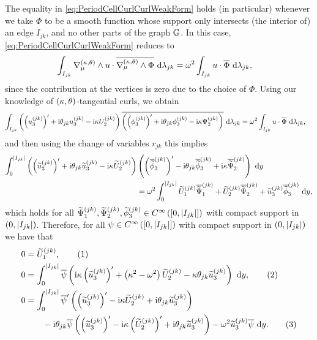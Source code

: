 \documentclass[11pt]{report}
\newcommand\labelthis{\addtocounter{equation}{1}\tag{\theequation}}
\begin{document}
The equality in \eqref{eq:PeriodCellCurlCurlWeakForm} holds (in particular) whenever we take $\Phi$ to be a smooth function whose support only intersects (the interior of) an edge $I_{jk}$, and no other parts of the graph $\mathbb{G}$.
In this case, \eqref{eq:PeriodCellCurlCurlWeakForm} reduces to
\begin{align*}
	\int_{I_{jk}} \nabla_{\mu}^{\left( \kappa, \theta \right)}\wedge u\cdot\overline{\nabla_{\mu}^{\left( \kappa, \theta \right)}\wedge\Phi}  \ \mathrm{d}\lambda_{jk} &= \omega^2 \int_{I_{jk}} u\cdot\overline{\Phi}  \ \mathrm{d}\lambda_{jk},
\end{align*}
since the contribution at the vertices is zero due to the choice of $\Phi$.
Using our knowledge of $\left( \kappa, \theta \right)$-tangential curls, we obtain
\begin{align*}
	\int_{I_{jk}} \left(  \left( u_3^{(jk)} \right)' + \mathrm{i}\theta_{jk} u_3^{(jk)} - \mathrm{i}\kappa U_2^{(jk)}  \right)\overline{\left(  \left( \phi_3^{(jk)} \right)' + \mathrm{i}\theta_{jk} \phi_3^{(jk)} - \mathrm{i}\kappa \Psi_2^{(jk)}  \right)}  \ \mathrm{d}\lambda_{jk}
	&= \omega^2 \int_{I_{jk}} u\cdot\overline{\Phi}  \ \mathrm{d}\lambda_{jk},
\end{align*}
and then using the change of variables $r_{jk}$ this implies
\begin{align*} 
	\int_0^{\left\lvert I_{jk} \right\rvert} \left(  \left( \widetilde{u}_3^{(jk)} \right)' + \mathrm{i}\theta_{jk} \widetilde{u}_3^{(jk)} - \mathrm{i}\kappa \widetilde{U}_2^{(jk)}  \right) 
	& \left(  \left( \overline{\widetilde{\phi}}_3^{(jk)} \right)' - \mathrm{i}\theta_{jk} \overline{\widetilde{\phi}}_3^{(jk)} + \mathrm{i}\kappa \overline{\widetilde{\Psi}}_2^{(jk)}  \right) \ \mathrm{d} y 
	\\
	&= \omega^2 \int_0^{\left\lvert I_{jk} \right\rvert} \widetilde{U}_1^{(jk)}\overline{\widetilde{\Psi}}_1^{(jk)} + \widetilde{U}_2^{(jk)}\overline{\widetilde{\Psi}}_2^{(jk)} + \widetilde{u}_3^{(jk)}\overline{\widetilde{\phi}}_3^{(jk)} \ \mathrm{d} y,
\end{align*}
which holds for all $\widetilde{\Psi}_1^{(jk)}, \widetilde{\Psi}_2^{(jk)}, \widetilde{\phi}_3^{(jk)}\in C^{\infty}\left( \left[ 0,\left\lvert I_{jk} \right\rvert \right] \right)$ with compact support in $\left( 0,\left\lvert I_{jk} \right\rvert \right)$.
Therefore, for all $\psi\in C^{\infty}\left( \left[ 0,\left\lvert I_{jk} \right\rvert \right] \right)$ with compact support in $\left( 0,\left\lvert I_{jk} \right\rvert \right)$ we have that
\begin{subequations}
	\begin{align*}
		0 &= \widetilde{U}_1^{(jk)}, \labelthis\label{eq:CurlCurlStrongFormPhi1} \\
		0 &= \int_0^{\abs{I_{jk}}} \overline{\psi} \bracs{ \rmi\wavenumber\bracs{\widetilde{u}_3^{(jk)}}' + \bracs{\wavenumber^2 - \omega^2}\widetilde{U}_2^{(jk)} - \wavenumber\qm_{jk}\widetilde{u}_3^{(jk)}  } \ \md y, \labelthis\label{eq:CurlCurlWeakFormPhi2} \\
		0 &= \int_0^{\abs{I_{jk}}} \overline{\psi}' \bracs{ \bracs{\widetilde{u}_3^{(jk)}}'
		- \rmi\wavenumber\widetilde{U}_2^{(jk)} + \rmi\qm_{jk}\widetilde{u}_3^{(jk)} } \\
		&\qquad -\rmi\qm_{jk}\overline{\psi}\bracs{ \bracs{\widetilde{u}_3^{(jk)}}' - \rmi\wavenumber\bracs{\widetilde{U}_2^{(jk)}}' + \rmi\qm_{jk}\widetilde{u}_3^{(jk)} }
		- \omega^2 \widetilde{u}_3^{(jk)}\overline{\psi} \ \md y. \labelthis\label{eq:CurlCurlWeakFormPhi3}
	\end{align*}
\end{subequations}
\end{document}
